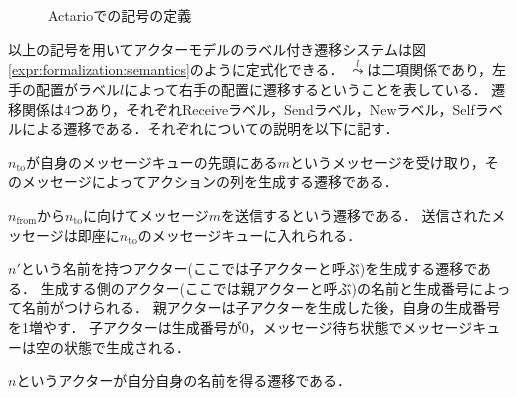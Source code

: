 \begin{figure}
  
  \caption{Actarioでの記号の定義}\label{code:formalization:config}
\end{figure}

以上の記号を用いてアクターモデルのラベル付き遷移システムは図\ref{expr:formalization:semantics}のように定式化できる．
$\overset{l}{\leadsto}$は二項関係であり，左手の配置がラベル$l$によって右手の配置に遷移するということを表している．
遷移関係は4つあり，それぞれ\textsf{Receive}ラベル，\textsf{Send}ラベル，\textsf{New}ラベル，\textsf{Self}ラベルによる遷移である．それぞれについての説明を以下に記す．

\begin{description}[style=nextline,leftmargin=12pt,parsep=0pt]
\item[$\textsf{Receive}(n_{\textrm{to}}, m)$]
  $n_{\textrm{to}}$が自身のメッセージキューの先頭にある$m$というメッセージを受け取り，そのメッセージによってアクションの列を生成する遷移である．
\item[$\textsf{Send}(n_{\textrm{from}}, n_{\textrm{to}}, m)$]
  $n_{\textrm{from}}$から$n_{\textrm{to}}$に向けてメッセージ$m$を送信するという遷移である．
  送信されたメッセージは即座に$n_{\textrm{to}}$のメッセージキューに入れられる．
\item[$\textsf{New}(n')$]
  $n'$という名前を持つアクター(ここでは子アクターと呼ぶ)を生成する遷移である．
  生成する側のアクター(ここでは親アクターと呼ぶ)の名前と生成番号によって名前がつけられる．
  親アクターは子アクターを生成した後，自身の生成番号を1増やす．
  子アクターは生成番号が0，メッセージ待ち状態でメッセージキューは空の状態で生成される．
\item[$\textsf{Self}(n)$]
  $n$というアクターが自分自身の名前を得る遷移である．
\end{description}


